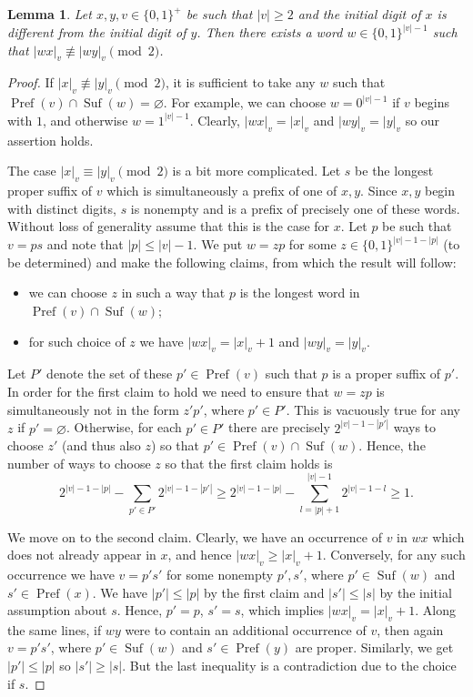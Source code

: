 \documentclass[a4paper,11pt]{amsart}
\newtheorem{lem}[thm]{Lemma}
\theoremstyle{definition}
\newcommand{\Pref}{\operatorname{Pref}}
\newcommand{\Suf}{\operatorname{Suf}}
\begin{document}
\begin{lem} \label{lem:prefix}
Let $x,y,v \in \{0,1\}^+$ be such that $|v| \geq 2$ and the initial digit of $x$ is different from the initial digit of $y$. Then there exists a word $w \in \{0,1\}^{|v|-1}$ such that $|wx|_{v} \not \equiv |wy|_{v} \pmod{2}$.
\end{lem}
\begin{proof}
If $|x|_{v} \not\equiv |y|_{v} \pmod{2}$, it is sufficient to take any $w$ such that $\Pref(v) \cap \Suf(w) = \varnothing$.
 For example, we can choose $w = 0^{|v|-1}$ if $v$ begins with $1$, and otherwise $w = 1^{|v|-1}$. Clearly, $|wx|_{v} = |x|_{v}$ and $|wy|_{v} = |y|_{v}$ so our assertion holds.

The case $|x|_{v} \equiv |y|_{v} \pmod{2}$ is a bit more complicated. Let $s$ be the longest proper suffix of $v$ which is simultaneously a prefix of one of $x,y$. Since $x,y$ begin with distinct digits, $s$ is nonempty and is a prefix of precisely one of these words. Without loss of generality assume that this is the case for $x$. Let $p$ be such that $v = ps$ and note that $|p| \leq |v|-1$.  We put $w = zp$ for some $z \in \{0,1\}^{|v|-1-|p|}$ (to be determined) and make the following claims, from which the result will follow:
\begin{itemize}
\item we can choose $z$ in such a way that $p$ is the longest word in $\Pref(v) \cap \Suf(w)$;
\item for such choice of $z$ we have $|wx|_{v} = |x|_{v} + 1$ and $|wy|_{v} = |y|_{v}$.
\end{itemize}

Let $P'$ denote the set of these $p' \in \Pref(v)$ such that $p$ is a proper suffix of $p'$. In order for the first claim to hold we need to ensure that $w=zp$ is simultaneously not in the form $z'p'$, where $p'\in P'$. This is vacuously true for any $z$ if $p'=\varnothing$. Otherwise, for each $p' \in P'$ there are precisely $2^{|v|-1-|p'|}$ ways to choose $z'$ (and thus also $z$) so that $p' \in \Pref(v) \cap \Suf(w)$. Hence, the number of ways to choose $z$ so that the first claim holds is
$$ 2^{|v|-1-|p|} - \sum_{p' \in P'} 2^{|v|-1-|p'|} \geq 2^{|v|-1-|p|} - \sum_{l=|p|+1}^{|v|-1} 2^{|v|-1-l}  \geq 1.$$ 

We move on to the second claim. Clearly, we have an occurrence of $v$ in $wx$ which does not already appear in $x$, and hence $|wx|_v \geq |x|_v +1  $. Conversely, for any such occurrence we have $v = p's'$ for some nonempty $p', s'$, where $p' \in \Suf(w)$ and $s' \in \Pref(x)$. We have $|p'| \leq |p|$ by the first claim and $|s'| \leq |s|$ by the initial assumption about $s$. Hence, $p'=p$, $s'=s$, which implies $|wx|_v = |x|_v + 1$. Along the same lines, if $wy$ were to contain an additional occurrence of $v$, then again $v = p's'$, where $p' \in \Suf(w)$ and $s' \in \Pref(y)$ are proper. Similarly, we get $|p'| \leq |p|$ so $|s'| \geq |s|$. But the last inequality is a contradiction due to the choice if $s$.
\end{proof}
\end{document}
